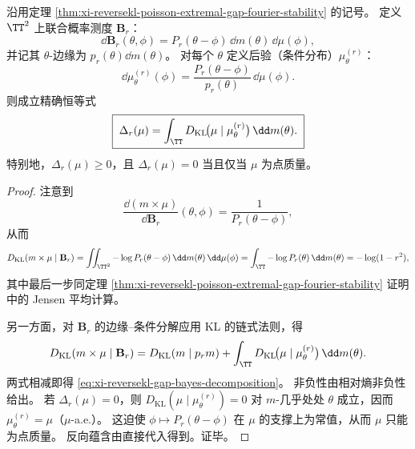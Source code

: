 \begin{theorem}\label{thm:xi-reversekl-gap-bayes-decomposition}
沿用定理 \ref{thm:xi-reversekl-poisson-extremal-gap-fourier-stability} 的记号。
定义 \(\TT^2\) 上联合概率测度 \(\mathbf B_r\)：
\[
\dd\mathbf B_r(\theta,\phi)=P_r(\theta-\phi)\,\dd m(\theta)\,\dd\mu(\phi),
\]
并记其 \(\theta\)-边缘为 \(p_r(\theta)\dd m(\theta)\)。
对每个 \(\theta\) 定义后验（条件分布）\(\mu_\theta^{(r)}\)：
\[
\dd\mu_\theta^{(r)}(\phi)=\frac{P_r(\theta-\phi)}{p_r(\theta)}\,\dd\mu(\phi).
\]
则成立精确恒等式
\begin{equation}\label{eq:xi-reversekl-gap-bayes-decomposition}
\boxed{\;
\Delta_r(\mu)
=\int_{\TT}D_{\mathrm{KL}}\!\bigl(\mu\mid \mu_\theta^{(r)}\bigr)\,\dd m(\theta).\;}
\end{equation}
特别地，\(\Delta_r(\mu)\ge 0\)，且 \(\Delta_r(\mu)=0\) 当且仅当 \(\mu\) 为点质量。
\end{theorem}
\begin{proof}
注意到
\[
\frac{\dd(m\times\mu)}{\dd\mathbf B_r}(\theta,\phi)=\frac{1}{P_r(\theta-\phi)},
\]
从而
\[
D_{\mathrm{KL}}(m\times\mu\mid \mathbf B_r)
=\iint_{\TT^2}-\log P_r(\theta-\phi)\,\dd m(\theta)\,\dd\mu(\phi)
=\int_{\TT}-\log P_r(\theta)\,\dd m(\theta)
=-\log(1-r^2),
\]
其中最后一步同定理 \ref{thm:xi-reversekl-poisson-extremal-gap-fourier-stability} 证明中的 Jensen 平均计算。
\par
另一方面，对 \(\mathbf B_r\) 的边缘--条件分解应用 KL 的链式法则，得
\[
D_{\mathrm{KL}}(m\times\mu\mid \mathbf B_r)
=D_{\mathrm{KL}}(m\mid p_r m)+\int_{\TT}D_{\mathrm{KL}}\!\bigl(\mu\mid \mu_\theta^{(r)}\bigr)\,\dd m(\theta).
\]
两式相减即得 \eqref{eq:xi-reversekl-gap-bayes-decomposition}。
非负性由相对熵非负性给出。
若 \(\Delta_r(\mu)=0\)，则 \(D_{\mathrm{KL}}(\mu\mid \mu_\theta^{(r)})=0\) 对 \(m\)-几乎处处 \(\theta\) 成立，因而 \(\mu_\theta^{(r)}=\mu\)（\(\mu\)-a.e.）。
这迫使 \(\phi\mapsto P_r(\theta-\phi)\) 在 \(\mu\) 的支撑上为常值，从而 \(\mu\) 只能为点质量。
反向蕴含由直接代入得到。证毕。
\end{proof}

